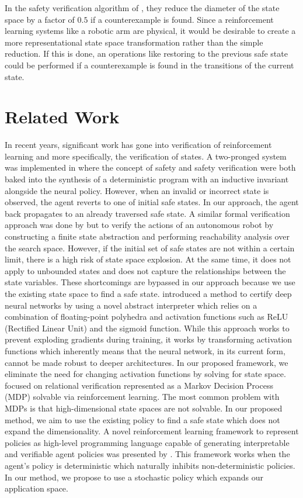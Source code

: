 \documentclass[11pt]{article}
\begin{document}
\noindent In the safety verification algorithm of \cite{zhu:2019}, they reduce the diameter of the state space by a factor of $0.5$ if a counterexample is found. Since a reinforcement learning systems like a robotic arm are physical, it would be desirable to create a more representational state space transformation rather than the simple reduction. If this is done, an operations like restoring to the previous safe state could be performed if a counterexample is found in the transitions of the current state. 

\section{Related Work}
In recent years, significant work has gone into verification of reinforcement learning and more specifically, the verification of states. A two-pronged system was implemented in \cite{zhu:2019} where the concept of safety and safety verification were both baked into the synthesis of a deterministic program with an inductive invariant alongside the neural policy. However, when an invalid or incorrect state is observed, the agent reverts to one of initial safe states. In our approach, the agent back propagates to an already traversed safe state.
A similar formal verification approach was done by \cite{sun:2019} but to verify the actions of an autonomous robot by constructing a finite state abstraction and performing reachability analysis over the search space. However, if the initial set of safe states are not within a certain limit, there is a high risk of state space explosion. At the same time, it does not apply to unbounded states and does not capture the relationships between the state variables. These shortcomings are bypassed in our approach because we use the existing state space to find a safe state. \cite{singh:2019} introduced a method to certify deep neural networks by using a novel abstract interpreter which relies on a combination of floating-point polyhedra and activation functions such as ReLU (Rectified Linear Unit) and the sigmoid function. While this approach works to prevent exploding gradients during training, it works by transforming activation functions which inherently means that the neural network, in its current form, cannot be made robust to deeper architectures. In our proposed framework, we eliminate the need for changing activation functions by solving for state space. \cite{chen:2019} focused on relational verification represented as a Markov Decision Process (MDP) solvable via reinforcement learning. The most common problem with MDPs is that high-dimensional state spaces are not solvable. In our proposed method, we aim to use the existing policy to find a safe state which does not expand the dimensionality. A novel reinforcement learning framework to represent policies as high-level programming language capable of generating interpretable and verifiable agent policies was presented by \cite{verma:2018}. This framework works when the agent's policy is deterministic which naturally inhibits non-deterministic policies. In our method, we propose to use a stochastic policy which expands our application space.


\end{document}
